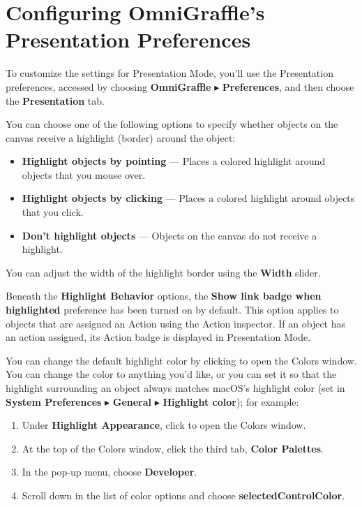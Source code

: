 \documentclass[../main.tex]{subfiles}
\begin{document}
\section{Configuring OmniGraffle's Presentation Preferences}

To customize the settings for Presentation Mode, you'll use the Presentation preferences,
accessed by choosing \textbf{OmniGraffle} $\blacktriangleright$ \textbf{Preferences}, and then
choose the \textbf{Presentation} tab.

You can choose one of the following options to specify whether objects on the canvas receive a
highlight (border) around the object:

\begin{itemize}
  \item \textbf{Highlight objects by pointing} --- Places a colored highlight around objects
    that you mouse over.
  \item \textbf{Highlight objects by clicking} --- Places a colored highlight around objects
    that you click.
  \item \textbf{Don't highlight objects} --- Objects on the canvas do not receive a highlight.
\end{itemize}

You can adjust the width of the highlight border using the \textbf{Width} slider.


Beneath the \textbf{Highlight Behavior} options, the \textbf{Show link badge when highlighted}
preference has been turned on by default. This option applies to objects that are assigned an
Action using the Action inspector. If an object has an action assigned, its Action badge is
displayed in Presentation Mode.


You can change the default highlight color by clicking
 to open the Colors window. You can change
the color to anything you'd like, or you can set it so that the highlight surrounding an
object always matches macOS's highlight color (set in \textbf{System Preferences}
$\blacktriangleright$ \textbf{General} $\blacktriangleright$ \textbf{Highlight color}); for
example:

\begin{enumerate}
  \item Under \textbf{Highlight Appearance}, click
     to open the Colors window.
  \item At the top of the Colors window, click the third tab, \textbf{Color Palettes}.
  \item In the pop-up menu, choose \textbf{Developer}.
  \item Scroll down in the list of color options and choose \textbf{selectedControlColor}.
\end{enumerate}
\end{document}
